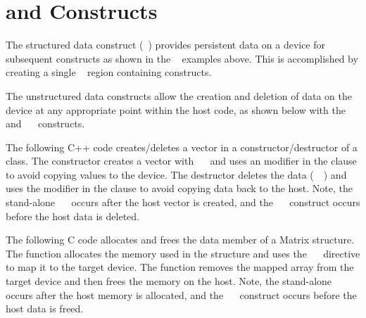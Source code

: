 \pagebreak
\section{   and    Constructs}
\label{sec:target_enter_exit_data}

The structured data construct (~) provides persistent data on a
device for subsequent  constructs as shown in the 
~ examples above. This is accomplished by creating a single
~ region containing  constructs.

The unstructured data constructs allow the creation and deletion of data on
the device at any appropriate point within the host code, as shown below 
with the ~~ and ~~ constructs.

The following C++ code creates/deletes a vector in a constructor/destructor 
of a class. The constructor creates a vector with ~~
and uses an  modifier in the  clause to avoid copying values
to the device. The destructor deletes the data (~~)
and uses the  modifier in the  clause to avoid copying data
back to the host. Note, the stand-alone ~~ occurs 
after the host vector is created, and the ~~
construct occurs before the host data is deleted.


\pagebreak
The following C code allocates and frees the data member of a Matrix structure.
The  function allocates the memory used in the structure and
uses the ~~ directive to map it to the target device. The
 function removes the mapped array from the target device
and then frees the memory on the host.  Note, the stand-alone 
~~ occurs after the host memory is allocated, and the 
~~ construct occurs before the host data is freed.

